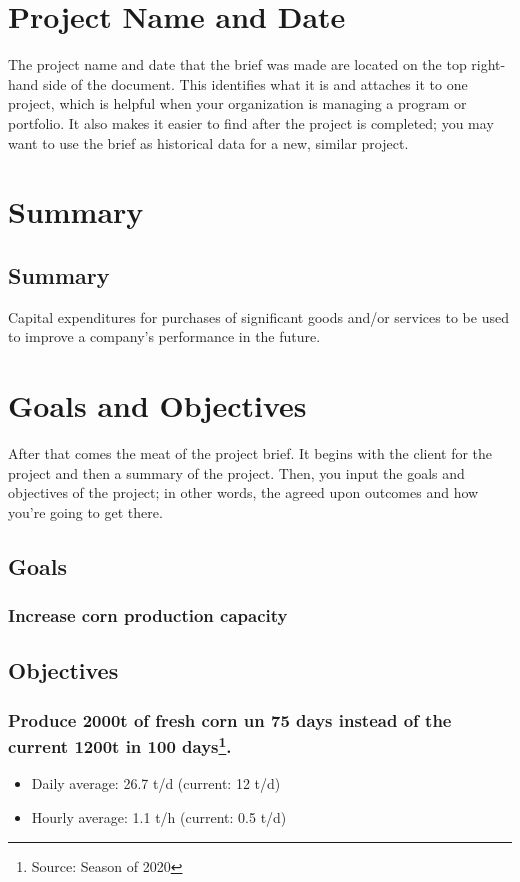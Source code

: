 \documentclass[11pt]{article}
\author{Ricardo Antunes}
\date{\today}
\title{}
\begin{document}
\tableofcontents

\section{Project Name and Date}
\label{sec:orgaa56a29}

The project name and date that the brief was made are located on the top right-hand side of the document. This identifies what it is and attaches it to one project, which is helpful when your organization is managing a program or portfolio. It also makes it easier to find after the project is completed; you may want to use the brief as historical data for a new, similar project.

\section{Summary}
\label{sec:orgddebded}
\subsection{Summary}
\label{sec:org371a931}
Capital expenditures for purchases of significant goods and/or services to be used to improve a company's performance in the future.

\section{Goals and Objectives}
\label{sec:org1791f65}

After that comes the meat of the project brief. It begins with the client for the project and then a summary of the project. Then, you input the goals and objectives of the project; in other words, the agreed upon outcomes and how you’re going to get there.

\subsection{Goals}
\label{sec:orge909908}
\subsubsection{Increase corn production capacity}
\label{sec:org1c44e33}

\subsection{Objectives}
\label{sec:org374e40e}
\subsubsection{Produce 2000t of fresh corn un 75 days instead of the current 1200t in 100 days\footnote{Source: Season of 2020}.}
\label{sec:org0bd1226}
\begin{itemize}
\item Daily average: 26.7 t/d (current: 12 t/d)
\item Hourly average: 1.1 t/h (current: 0.5 t/d)
\end{itemize}
\end{document}
